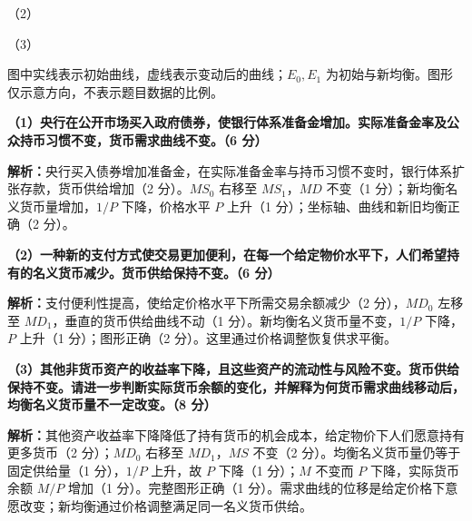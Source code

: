 \documentclass[UTF8,11pt,a4paper,fontset=fandol]{ctexart}
\newcommand{\ans}[1]{\par\textbf{解析：}#1\par}
\begin{document}
\begin{center}
\begin{minipage}[t]{0.33\linewidth}
\begin{tikzpicture}[x=0.38cm,y=0.42cm,>=Stealth,font=\scriptsize]
\end{tikzpicture}\par（2）\end{minipage}\hfill%
\begin{minipage}[t]{0.33\linewidth}\centering{}\par（3）\end{minipage}\hfill%
\end{center}
{\small 图中实线表示初始曲线，虚线表示变动后的曲线；$E_0,E_1$ 为初始与新均衡。图形仅示意方向，不表示题目数据的比例。}

\textbf{（1）央行在公开市场买入政府债券，使银行体系准备金增加。实际准备金率及公众持币习惯不变，货币需求曲线不变。（6 分）}
\ans{央行买入债券增加准备金，在实际准备金率与持币习惯不变时，银行体系扩张存款，货币供给增加（2 分）。$MS_0$ 右移至 $MS_1$，$MD$ 不变（1 分）；新均衡名义货币量增加，$1/P$ 下降，价格水平 $P$ 上升（1 分）；坐标轴、曲线和新旧均衡正确（2 分）。}

\textbf{（2）一种新的支付方式使交易更加便利，在每一个给定物价水平下，人们希望持有的名义货币减少。货币供给保持不变。（6 分）}
\ans{支付便利性提高，使给定价格水平下所需交易余额减少（2 分），$MD_0$ 左移至 $MD_1$，垂直的货币供给曲线不动（1 分）。新均衡名义货币量不变，$1/P$ 下降，$P$ 上升（1 分）；图形正确（2 分）。这里通过价格调整恢复供求平衡。}

\textbf{（3）其他非货币资产的收益率下降，且这些资产的流动性与风险不变。货币供给保持不变。请进一步判断实际货币余额的变化，并解释为何货币需求曲线移动后，均衡名义货币量不一定改变。（8 分）}
\ans{其他资产收益率下降降低了持有货币的机会成本，给定物价下人们愿意持有更多货币（2 分）；$MD_0$ 右移至 $MD_1$，$MS$ 不变（2 分）。均衡名义货币量仍等于固定供给量（1 分），$1/P$ 上升，故 $P$ 下降（1 分）；$M$ 不变而 $P$ 下降，实际货币余额 $M/P$ 增加（1 分）。完整图形正确（1 分）。需求曲线的位移是给定价格下意愿改变；新均衡通过价格调整满足同一名义货币供给。}
\end{document}
